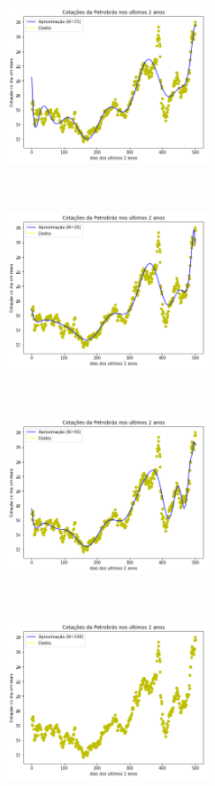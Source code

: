 \documentclass{article}
\begin{document}
\begin{figure}[!htb]
\includegraphics [width=6cm,height=6cm]{G15.png}
\includegraphics [width=6cm,height=6cm]{G20.png}
\includegraphics [width=6cm,height=6cm]{G50.png}
\includegraphics [width=6cm,height=6cm]{G100.png}
\end{figure}
\end{document}
